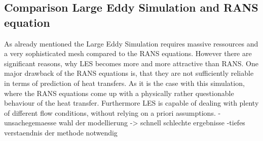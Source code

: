 \subsection{Comparison Large Eddy Simulation and RANS equation}
As already mentioned the Large Eddy Simulation requires massive ressources and a very sophisticated mesh compared to the RANS equations. However there are significant reasons, why LES becomes more and more attractive than RANS. One major drawback of the RANS equations is, that they are not sufficiently reliable in terms of prediction of heat transfers. As it is the case with this simulation, where the RANS equations come up with a physically rather questionable behaviour of the heat transfer. 
Furthermore LES is capable of dealing with plenty of different flow conditions, without relying on a priori assumptions.
-unsachegemaesse wahl der modellierung -> schnell schlechte ergebnisse
-tiefes verstaendnis der methode notwendig

